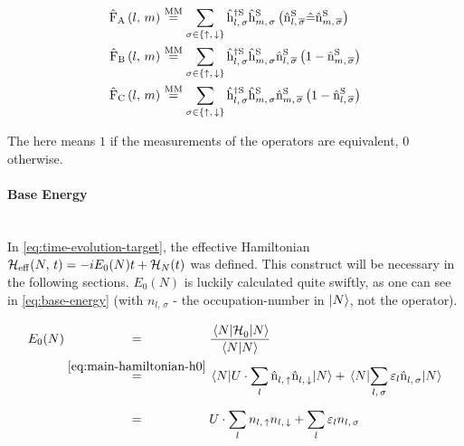 \begin{equation}
    \label{eq:interaction-picture-v-ham-parts-simplified}
    \begin{split}
        \VhamiltonianOperatorPart{A}{l}{m} &\stackrel{\text{MM}}{=} 
        \lsum[\sigma \in \left\{\up,\,\down\right\}]
        \withspinhcop[\schroedingerPicture]{l}{\sigma}{\dagger}\withspinhcop[\schroedingerPicture]{m}{\sigma}{}
        \left(\nop[\schroedingerPicture]{l}{\overline{\sigma}}
            \equivalentOperator 
            \nop[\schroedingerPicture]{m}{\overline{\sigma}}
        \right)
        \\
        \VhamiltonianOperatorPart{B}{l}{m} &\stackrel{\text{MM}}{=} 
        \lsum[\sigma \in \left\{\up,\,\down\right\}]        
        \withspinhcop[\schroedingerPicture]{l}{\sigma}{\dagger}\withspinhcop[\schroedingerPicture]{m}{\sigma}{}
        \nop[\schroedingerPicture]{l}{\overline{\sigma}}
        \left(
            1 - \nop[\schroedingerPicture]{m}{\overline{\sigma}}
        \right)
        \\
        \VhamiltonianOperatorPart{C}{l}{m} &\stackrel{\text{MM}}{=} 
        \lsum[\sigma \in \left\{\up,\,\down\right\}]
        \withspinhcop[\schroedingerPicture]{l}{\sigma}{\dagger}\withspinhcop[\schroedingerPicture]{m}{\sigma}{}
        \nop[\schroedingerPicture]{m}{\overline{\sigma}}
        \left(
           1 - \nop[\schroedingerPicture]{l}{\overline{\sigma}}
        \right)
        \\
    \end{split}
\end{equation}

The \equivalentOperator here means \glqq $1$ if the measurements of the operators are equivalent, $0$ otherwise\grqq.

\paragraph*{Base Energy}\makebox{}\\

In \autoref{eq:time-evolution-target}, the effective Hamiltonian ${\mathcal{H}_\text{eff}}^{}({N},\,t) = -i E_0(N) t + \mathcal{H}_{N}(t)$ was defined.
This construct will be necessary in the following sections. 
$E_0(N)$ is luckily calculated quite swiftly, as one can see in \autoref{eq:base-energy} (with $n_{l,\,\sigma}$ - the occupation-number in $\ket{N}$, not the operator).

\begin{equation}
    \label{eq:base-energy}
    \begin{split}
        E_0(N) &\stackrel{\phantom{\ref{eq:main-hamiltonian-h0}}}{=} \frac{\bracketHelper{N}{\HzeroHamiltonian[]}{N}}{\braketHelper{N}{N}} \\
        &\stackrel{\ref{eq:main-hamiltonian-h0}}{=} \bracketHelper{N}{U \cdot \lsum \nop{l}{\up}\nop{l}{\down}}{N} + \bracketHelper{N}{\lsum[l,\,\sigma] \epsl \nop{l}{\sigma}}{N}\\
        &\stackrel{\phantom{\ref{eq:main-hamiltonian-h0}}}{=} U \cdot \lsum n_{l,\,\up}n_{l,\,\down} + \lsum \epsl n_{l,\,\sigma}
    \end{split}
\end{equation}

